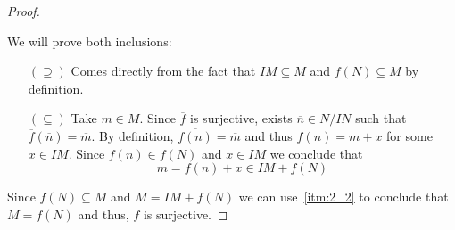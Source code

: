 \begin{problem}
\begin{enumerate}[label=(\theproblem.\arabic*),ref=\theproblem.\arabic*]
\begin{sol}
\begin{proof}
\begin{claim}
                        \begin{sol}
                            We will prove both inclusions:
                            \begin{itemize}
                                \item[$(\supseteq)$] Comes directly from the fact that $IM \subseteq M$ and $f(N) \subseteq M$ by definition.
                                \item[$(\subseteq)$] Take $m \in M$.
                                Since $\overline{f}$ is surjective, exists $\overline{n} \in N/IN$ such that $\overline{f}(\overline{n}) = \overline{m}$.
                                By definition, $\overline{f(n)} = \overline{m}$ and thus $f(n) = m + x$ for some $x \in IM$.
                                Since $f(n) \in f(N)$ and $x \in IM$ we conclude that
                                \[
                                    m = f(n) + x \in IM + f(N)
                                \]
                            \end{itemize}
                        \end{sol}
                    \end{claim}
                    Since $f(N) \subseteq M$ and $M = IM + f(N)$ we can use~\ref{itm:2_2} to conclude that $M = f(N)$ and thus, $f$ is surjective.
                \end{proof}
            \end{sol}
    \end{enumerate}
\end{problem}